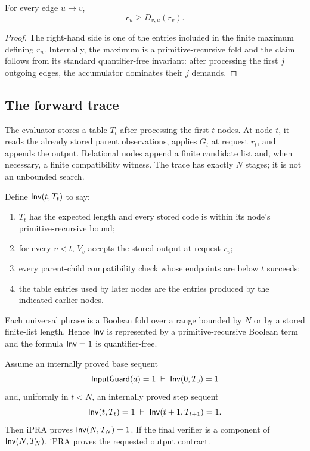 \begin{lemma}
For every edge \(u\to v\),
\[
        r_u\ge D_{v,u}(r_v).
\]
\end{lemma}

\begin{proof}
The right-hand side is one of the entries included in the finite maximum
defining \(r_u\).  Internally, the maximum is a primitive-recursive fold and
the claim follows from its standard quantifier-free invariant:
after processing the first \(j\) outgoing edges, the accumulator dominates
their \(j\) demands.
\end{proof}

\subsection{The forward trace}

The evaluator stores a table \(T_t\) after processing the first \(t\) nodes.
At node \(t\), it reads the already stored parent observations, applies
\(G_t\) at request \(r_t\), and appends the output.  Relational nodes append a
finite candidate list and, when necessary, a finite compatibility witness.
The trace has exactly \(N\) stages; it is not an unbounded search.

Define \(\mathsf{Inv}(t,T_t)\) to say:
\begin{enumerate}[label=(\roman*)]
\item \(T_t\) has the expected length and every stored code is within its
      node's primitive-recursive bound;
\item for every \(v<t\), \(V_v\) accepts the stored output at request \(r_v\);
\item every parent-child compatibility check whose endpoints are below \(t\)
      succeeds;
\item the table entries used by later nodes are the entries produced by the
      indicated earlier nodes.
\end{enumerate}
Each universal phrase is a Boolean fold over a range bounded by \(N\) or by a
stored finite-list length.  Hence \(\mathsf{Inv}\) is represented by a
primitive-recursive Boolean term and the formula \(\mathsf{Inv}=1\) is
quantifier-free.

\begin{theorem}
Assume an internally proved base sequent
\[
      \mathsf{InputGuard}(d)=1 \;\vdash\; \mathsf{Inv}(0,T_0)=1
\]
and, uniformly in \(t<N\), an internally proved step sequent
\[
      \mathsf{Inv}(t,T_t)=1
      \;\vdash\;
      \mathsf{Inv}(t+1,T_{t+1})=1.
\]
Then iPRA proves \(\mathsf{Inv}(N,T_N)=1\).  If the final verifier is a component of
\(\mathsf{Inv}(N,T_N)\), iPRA proves the requested output contract.
\end{theorem}

